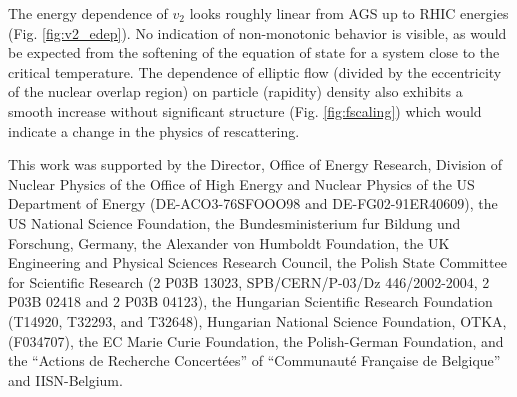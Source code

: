 \documentclass[aps,prc,superscriptaddress,showpacs,floatfix,nofootinbib]{revtex4}
\begin{document}
The energy dependence of $v_2$ looks roughly linear from AGS up to
RHIC energies (Fig. \ref{fig:v2_edep}).  No indication of
non-monotonic behavior is visible, as would be expected from the
softening of the equation of state for a system close to the critical
temperature.  The dependence of elliptic flow (divided by the
eccentricity of the nuclear overlap region) on particle (rapidity)
density also exhibits a smooth increase without significant structure
(Fig. \ref{fig:fscaling}) which would indicate a change in the physics
of rescattering.


\begin{acknowledgments}
This work was supported by the Director, Office of Energy Research,
Division of Nuclear Physics of the Office of High Energy and Nuclear
Physics of the US Department of Energy (DE-ACO3-76SFOOO98 and
DE-FG02-91ER40609), the US National Science Foundation, the
Bundesministerium fur Bildung und Forschung, Germany, the Alexander
von Humboldt Foundation, the UK Engineering and Physical Sciences
Research Council, the Polish State Committee for Scientific Research
(2 P03B 13023, SPB/CERN/P-03/Dz 446/2002-2004, 2 P03B 02418 and 2
P03B 04123), the Hungarian Scientific Research Foundation (T14920,
T32293, and T32648), Hungarian National Science Foundation, OTKA,
(F034707), the EC Marie Curie Foundation, the Polish-German
Foundation, and the ``Actions de Recherche Concert{\'e}es'' of
``Communaut{\'e} Fran{\c c}aise de Belgique'' and IISN-Belgium.
\end{acknowledgments}


\appendix
\end{document}
